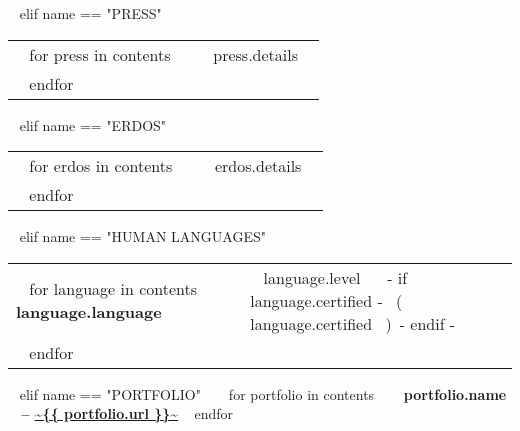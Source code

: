 \begin{minipage}{\textwidth}
~{ elif name == "PRESS" }~

\begin{tabular}{ @{} p{32mm} p{135mm} @{} }
  ~{ for press in contents }~
  \small \textcolor{gray}{{\emph{ }}} & {\small ~{{ press.details }}~} \\
  ~{ endfor }~
\end{tabular}



~{ elif name == "ERDOS" }~

\begin{tabular}{ @{} p{32mm} p{135mm} @{} }
  ~{ for erdos in contents }~
  \small \textcolor{gray}{{\emph{ }}} & {\small ~{{ erdos.details }}~} \\
  ~{ endfor }~
\end{tabular}



~{ elif name == "HUMAN LANGUAGES" }~
  \begin{tabular}{ @{} p{32mm} p{135mm} @{} }
  ~{ for language in contents }~
    \bf {~{{ language.language }}~} & {\small ~{{ language.level }}~ ~{- if language.certified -}~ \small\color{maingrey}\hspace{1mm}(~{{ language.certified }}~)~{- endif -}~} \\
  ~{ endfor }~
  \end{tabular}
  \vspace{50mm}




~{ elif name == "PORTFOLIO" }~
  ~{ for portfolio in contents }~
    {\bf ~{{ portfolio.name }}~ -- \color{maincolor}\url{~{{ portfolio.url }}~} }
    \vspace{1mm}
  ~{ endfor }~
  \vspace{5mm}



\end{minipage}
